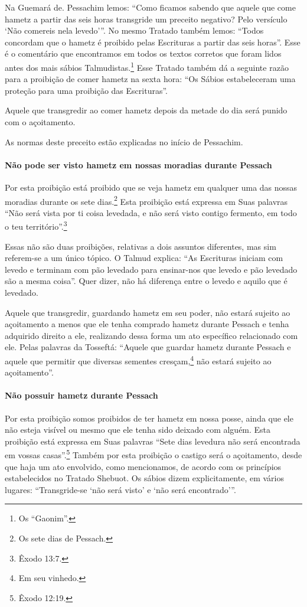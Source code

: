 Na Guemará de. Pessachim lemos: ``Como ficamos sabendo que aquele que
come hametz a partir das seis horas transgride um preceito negativo?
Pelo versículo `Não comereis nela levedo'''. No mesmo Tratado também
lemos: ``Todos concordam que o hametz é proibido pelas Escrituras a
partir das seis horas''. Esse é o comentário que encontramos em todos os
textos corretos que foram lidos antes dos mais sábios
Talmudistas.\footnote{Os ``Gaonim''.} Esse Tratado também dá a seguinte
razão para a proibição de comer hametz na sexta hora: ``Os Sábios
estabeleceram uma proteção para uma proibição das Escrituras''.

Aquele que transgredir ao comer hametz depois da metade do dia será
punido com o açoitamento.

As normas deste preceito estão explicadas no início de Pessachim.

\paragraph{Não pode ser visto hametz em nossas moradias durante Pessach}

Por esta proibição está proibido que se veja hametz em qualquer uma
das nossas moradias durante os sete dias.\footnote{Os sete dias de Pessach.} Esta
proibição está expressa em Suas palavras ``Não será vista por ti coisa
levedada, e não será visto contigo fermento, em todo o teu território''.\footnote{Êxodo 13:7.}

Essas não são duas proibições, relativas a dois assuntos diferentes, mas
sim referem-se a um único tópico. O Talmud explica: ``As Escrituras
iniciam com levedo e terminam com pão levedado para ensinar-nos que
levedo e pão levedado são a mesma coisa''. Quer dizer, não há diferença
entre o levedo e aquilo que é levedado.

Aquele que transgredir, guardando hametz em seu poder, não estará
sujeito ao açoitamento a menos que ele tenha comprado hametz
durante Pessach e tenha adquirido direito a ele, realizando dessa
forma um ato específico relacionado com ele. Pelas palavras da
Tosseftá: ``Aquele que guardar hametz durante Pessach e aquele que
permitir que diversas sementes cresçam,\footnote{Em seu vinhedo.} não estará sujeito ao açoitamento''.

\paragraph{Não possuir hametz durante Pessach}

Por esta proibição somos proibidos de ter hametz em nossa posse,
ainda que ele não esteja visível ou mesmo que ele tenha sido deixado com
alguém. Esta proibição está expressa em Suas palavras ``Sete dias
levedura não será encontrada em vossas casas''.\footnote{Êxodo 12:19.} Também por
esta proibição o castigo será o açoitamento, desde que haja um ato
envolvido, como mencionamos, de acordo com os princípios estabelecidos
no Tratado Shebuot. Os sábios dizem explicitamente, em vários lugares:
``Transgride-se `não será visto' e `não será encontrado'''.

